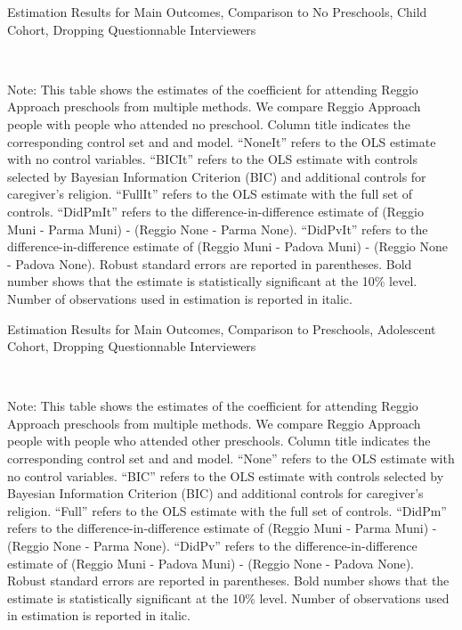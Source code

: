 \begin{table}[H] \caption{Estimation Results for Main Outcomes, Comparison to No Preschools, Child Cohort, Dropping Questionnable Interviewers} \label{ols-M-child-reg-nopres-dropint}
\scalebox{0.8}{}
\vspace{1ex} \\
\footnotesize\raggedright{Note: This table shows the estimates of the coefficient for attending Reggio Approach preschools from multiple methods. We compare Reggio Approach people with people who attended no preschool. Column title indicates the corresponding control set and and model. ``NoneIt'' refers to the OLS estimate with no control variables. ``BICIt'' refers to the OLS estimate with controls selected by Bayesian Information Criterion (BIC) and additional controls for caregiver's religion. ``FullIt'' refers to the OLS estimate with the full set of controls. ``DidPmIt'' refers to the difference-in-difference estimate of (Reggio Muni - Parma Muni) - (Reggio None - Parma None). ``DidPvIt'' refers to the difference-in-difference estimate of (Reggio Muni - Padova Muni) - (Reggio None - Padova None). Robust standard errors are reported in parentheses. Bold number shows that the estimate is statistically significant at the 10\% level. Number of observations used in estimation is reported in italic.}

\end{table}


\begin{table}[H] \caption{Estimation Results for Main Outcomes, Comparison to Preschools, Adolescent Cohort, Dropping Questionnable Interviewers} \label{ols-M-adol-reg-pres-dropint}
\scalebox{0.8}{}
\vspace{1ex} \\
\footnotesize\raggedright{Note: This table shows the estimates of the coefficient for attending Reggio Approach preschools from multiple methods. We compare Reggio Approach people with people who attended other preschools. Column title indicates the corresponding control set and and model. ``None'' refers to the OLS estimate with no control variables. ``BIC'' refers to the OLS estimate with controls selected by Bayesian Information Criterion (BIC) and additional controls for caregiver's religion. ``Full'' refers to the OLS estimate with the full set of controls. ``DidPm'' refers to the difference-in-difference estimate of (Reggio Muni - Parma Muni) - (Reggio None - Parma None). ``DidPv'' refers to the difference-in-difference estimate of (Reggio Muni - Padova Muni) - (Reggio None - Padova None). Robust standard errors are reported in parentheses. Bold number shows that the estimate is statistically significant at the 10\% level. Number of observations used in estimation is reported in italic.}
\end{table}

